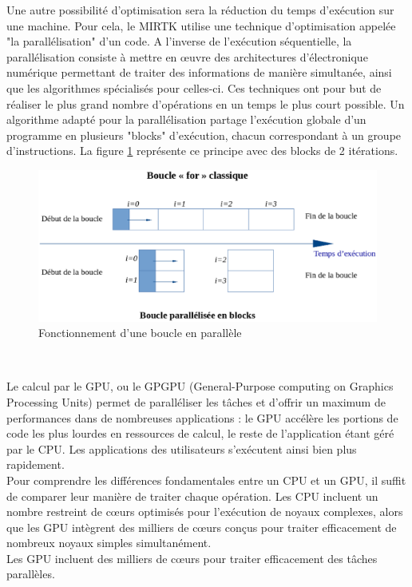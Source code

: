 \documentclass[10pt]{report}
\begin{document}
	Une autre possibilité d'optimisation sera la réduction du temps d'exécution sur une machine. Pour cela, le MIRTK utilise une technique d'optimisation appelée "la parallélisation" d'un code. 
	A l'inverse de l'exécution séquentielle, la parallélisation consiste à mettre en œuvre des architectures d'électronique numérique permettant de traiter des informations de manière simultanée, ainsi que les algorithmes spécialisés pour celles-ci. Ces techniques ont pour but de réaliser le plus grand nombre d'opérations en un temps le plus court possible.
	Un algorithme adapté pour la parallélisation partage l'exécution globale d'un programme en plusieurs "blocks" d'exécution, chacun correspondant à un groupe d'instructions. La figure \ref{Fonctionnement d'une boucle en parallèle} représente ce principe avec des blocks de 2 itérations.
	\begin{figure}[h!]
		\begin{center}
			\includegraphics[width=14cm]{Reports/figures/gfor.eps}	
		\end{center}
		\caption{Fonctionnement d'une boucle en parallèle}
		\label{Fonctionnement d'une boucle en parallèle}
	\end{figure}
	~\par
	Le calcul par le GPU, ou le GPGPU (General-Purpose computing on Graphics Processing Units) permet de paralléliser les tâches et d'offrir un maximum de performances dans de nombreuses applications : le GPU accélère les portions de code les plus lourdes en ressources de calcul, le reste de l'application étant géré par le CPU. Les applications des utilisateurs s'exécutent ainsi bien plus rapidement.\\
	Pour comprendre les différences fondamentales entre un CPU et un GPU, il suffit de comparer leur manière de traiter chaque opération. Les CPU incluent un nombre restreint de cœurs optimisés pour l'exécution de noyaux complexes, alors que les GPU intègrent des milliers de cœurs conçus pour traiter efficacement de nombreux noyaux simples simultanément.\\
	Les GPU incluent des milliers de cœurs pour traiter efficacement des tâches parallèles. \\ 
	 
\end{document}
